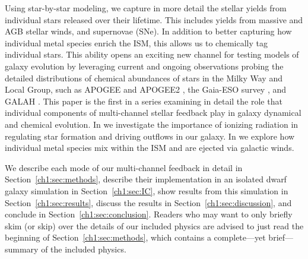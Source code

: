 Using star-by-star modeling, we capture in more detail the stellar yields from individual stars released over their lifetime. This includes yields from massive and AGB stellar winds, and supernovae (SNe). In addition to better capturing how individual metal species enrich the ISM, this allows us to chemically tag individual stars. This ability opens an exciting new channel for testing models of galaxy evolution by leveraging current and ongoing observations probing the detailed distributions of chemical abundances of stars in the Milky Way and Local Group, such as APOGEE and APOGEE2 \citep{APOGEE2010,APOGEE}, the Gaia-ESO survey \citep{Gaia}, and GALAH \citep{GALAH}. This paper is the first in a series examining in detail the role that individual components of multi-channel stellar feedback play in galaxy dynamical and chemical evolution. In \cite{Emerick2018b} we investigate the importance of ionizing radiation in regulating star formation and driving outflows in our galaxy. In \cite{Emerick2018b} we explore how individual metal species mix within the ISM and are ejected via galactic winds.

We describe each mode of our multi-channel feedback
in detail in Section~\ref{ch1:sec:methods}, describe their implementation in an isolated dwarf galaxy simulation in Section~\ref{ch1:sec:IC}, show results from this simulation in Section~\ref{ch1:sec:results}, discuss the results in Section~\ref{ch1:sec:discussion}, and conclude in Section~\ref{ch1:sec:conclusion}. Readers who may want to only briefly skim (or skip) over the details of our included physics are advised to just read the beginning of Section~\ref{ch1:sec:methods}, which contains a complete---yet brief---summary of the included physics.

